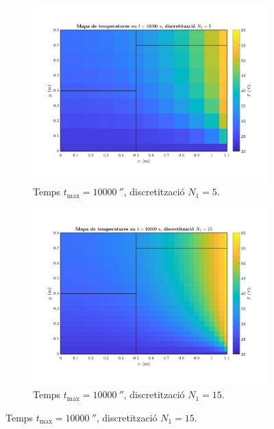 \begin{figure}[ht]
	\centering
	\begin{subfigure}{.5\textwidth}
		\centering
		\includegraphics[width=.95\linewidth]{imagenes/04_influencia/malla/malla_7.pdf}
		\vspace{-15pt}
		\caption{Temps $t_\text{max} = 10000 \ \second$, discretització $N_1 = 5$.}
		\label{fig:malla_7}
	\end{subfigure}%
	\begin{subfigure}{.5\textwidth}
		\centering
		\includegraphics[width=.95\linewidth]{imagenes/04_influencia/malla/malla_8.pdf}
		\vspace{-15pt}
		\caption{Temps $t_\text{max} = 10000 \ \second$, discretització $N_1 = 15$.}
		\label{fig:malla_8}
	\end{subfigure}

\end{figure}
